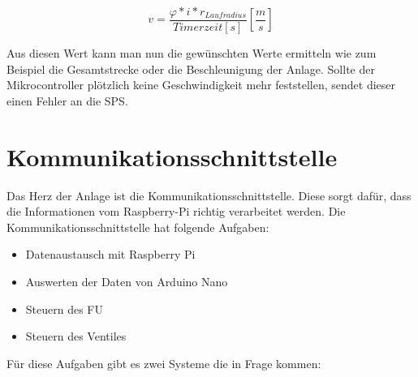 \begin{center}
\begin{equation}
  \label{eq:9}
	v = \frac{\varphi * i * r_{Laufradius}}{Timerzeit [s]} [\frac{m}{s}]
\end{equation} 
\end{center}

Aus diesen Wert kann man nun die gewünschten Werte ermitteln wie zum Beispiel die Gesamtstrecke oder die Beschleunigung der Anlage. Sollte der Mikrocontroller plötzlich keine Geschwindigkeit mehr feststellen, sendet dieser einen Fehler an die SPS.

\newpage
\section{Kommunikationsschnittstelle}
\label{sec:kommunikationsschnittstelle}

Das Herz der Anlage ist die Kommunikationsschnittstelle. Diese sorgt dafür, dass die Informationen vom Raspberry-Pi richtig verarbeitet werden. Die Kommunikationsschnittstelle hat folgende Aufgaben:

\begin{itemize}
	\item{Datenaustausch mit Raspberry Pi}
	\item{Auswerten der Daten von Arduino Nano}
	\item{Steuern des \ac{FU}}
	\item{Steuern des Ventiles}
\end{itemize}

Für diese Aufgaben gibt es zwei Systeme die in Frage kommen: 

